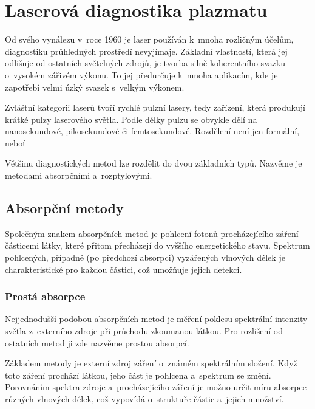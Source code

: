 \chapter{Laserová diagnostika plazmatu}
\label{sec:diagnostics}

\newcommand\photonflux{\Gamma}

Od svého vynálezu v~roce 1960 je laser používán k~mnoha rozličným účelům,
diagnostiku průhledných prostředí nevyjímaje.
Základní vlastností, která jej odlišuje od ostatních světelných zdrojů,
je tvorba silně koherentního svazku o~vysokém zářivém výkonu.
To jej předurčuje k~mnoha aplikacím, kde je zapotřebí velmi úzký svazek
s~velkým výkonem.

Zvláštní kategorii laserů tvoří rychlé pulzní lasery, tedy zařízení,
která produkují krátké pulzy laserového světla.
Podle délky pulzu se obvykle dělí na nanosekundové, pikosekundové
či femtosekundové.
Rozdělení není jen formální, neboť %

Většinu diagnostických metod lze rozdělit do dvou základních typů.
Nazvěme je metodami absorpčními a~rozptylovými.

\section{Absorpční metody}
\label{sec:diagnostics-absorption}
Společným znakem absorpčních metod je pohlcení fotonů procházejícího
záření částicemi látky, které přitom přecházejí do vyššího energetického
stavu.
Spektrum pohlcených, případně (po předchozí absorpci) vyzářených vlnových
délek je charakteristické pro každou částici, což umožňuje jejich detekci.

\subsection{Prostá absorpce}
\label{sec:diagnostics-absorptionplain}
Nejjednodušší podobou absorpčních metod je měření poklesu spektrální
intenzity světla z~externího zdroje při průchodu zkoumanou látkou.
Pro rozlišení od ostatních metod ji zde nazvěme prostou absorpcí.

Základem metody je externí zdroj záření o~známém spektrálním složení.
Když toto záření prochází látkou, jeho část je pohlcena a~spektrum se změní.
Porovnáním spektra zdroje a~procházejícího záření je možno určit míru
absorpce různých vlnových délek, což vypovídá o~struktuře částic
a~jejich množství.

